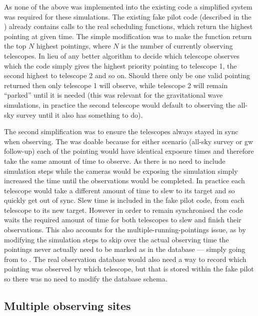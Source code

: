 \begin{colsection}
\begin{colsection}
As none of the above was implemented into the existing code a simplified system was required for these simulations. The existing fake pilot code (described in the ) already contains calls to the real scheduling functions, which return the highest pointing at given time. The simple modification was to make the function return the top $N$ highest pointings, where $N$ is the number of currently observing telescopes. In lieu of any better algorithm to decide which telescope observes which the code simply gives the highest priority pointing to telescope 1, the second highest to telescope 2 and so on. Should there only be one valid pointing returned then only telescope 1 will observe, while telescope 2 will remain ``parked'' until it is needed (this was relevant for the gravitational wave simulations, in practice the second telescope would default to observing the all-sky survey until it also has something to do).

The second simplification was to ensure the telescopes always stayed in sync when observing. The was doable because for either scenario (all-sky survey or \gls{gw} follow-up) each of the pointing would have identical exposure times and therefore take the same amount of time to observe. As there is no need to include simulation steps while the cameras would be exposing the simulation simply increased the time until the observations would be completed. In practice each telescope would take a different amount of time to slew to its target and so quickly get out of sync. Slew time is included in the fake pilot code, from each telescope to its new target. However in order to remain synchronised the code waits the required amount of time for both telescopes to slew and finish their observations. This also accounts for the multiple-running-pointings issue, as by modifying the simulation steps to skip over the actual observing time the pointings never actually need to be marked as  in the database --- simply going from  to . The real observation database would also need a way to record which pointing was observed by which telescope, but that is stored within the fake pilot so there was no need to modify the database schema.

\end{colsection}


\subsection{Multiple observing sites}
\label{sec:multi_site_scheduling}
\begin{colsection}


\end{colsection}
\end{colsection}
